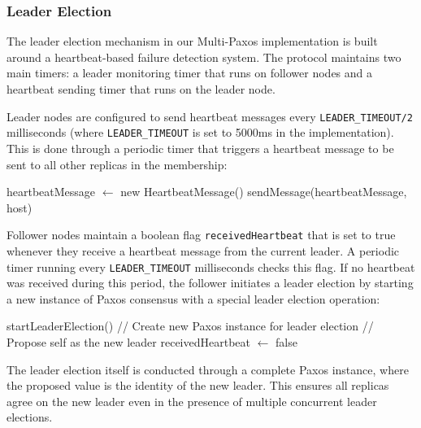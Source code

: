 \documentclass[10pt,a4paper,twocolumn]{article}
\begin{document}
\subsubsection{Leader Election}
The leader election mechanism in our Multi-Paxos implementation is built around a heartbeat-based failure detection system. The protocol maintains two main timers: a leader monitoring timer that runs on follower nodes and a heartbeat sending timer that runs on the leader node.

Leader nodes are configured to send heartbeat messages every \texttt{LEADER\_TIMEOUT/2} milliseconds (where \texttt{LEADER\_TIMEOUT} is set to 5000ms in the implementation). This is done through a periodic timer that triggers a heartbeat message to be sent to all other replicas in the membership:

\begin{algorithm}[H]
	\begin{algorithmic}
		\State heartbeatMessage $\leftarrow$ new HeartbeatMessage()
		\State sendMessage(heartbeatMessage, host)
		\EndIf
		\EndFor
		\EndIf
	\end{algorithmic}
\end{algorithm}

Follower nodes maintain a boolean flag \texttt{receivedHeartbeat} that is set to true whenever they receive a heartbeat message from the current leader. A periodic timer running every \texttt{LEADER\_TIMEOUT} milliseconds checks this flag. If no heartbeat was received during this period, the follower initiates a leader election by starting a new instance of Paxos consensus with a special leader election operation:

\begin{algorithm}[H]
	\begin{algorithmic}
		\If{!isLeader \textbf{ and } !receivedHeartbeat}
		\State startLeaderElection()
		\State // Create new Paxos instance for leader election
		\State // Propose self as the new leader
		\EndIf
		\State receivedHeartbeat $\leftarrow$ false
	\end{algorithmic}
\end{algorithm}

The leader election itself is conducted through a complete Paxos instance, where the proposed value is the identity of the new leader. This ensures all replicas agree on the new leader even in the presence of multiple concurrent leader elections.
\end{document}
